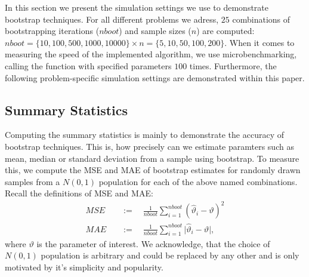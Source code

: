 In this section we present the simulation settings we use to demonstrate bootstrap techniques. For all different problems we adress, $25$ combinations of bootstrapping iterations ($nboot$) and sample sizes ($n$) are computed: $nboot = \{10, 100, 500, 1000, 10000\} \times n = \{5, 10, 50, 100, 200\}$. When it comes to measuring the speed of the implemented algorithm, we use microbenchmarking, calling the function with specified parameters $100$ times. Furthermore, the following problem-specific simulation settings are demonstrated within this paper.

\subsection{Summary Statistics}
Computing the summary statistics is mainly to demonstrate the accuracy of bootstrap techniques. This is, how precisely can we estimate paramters such as mean, median or standard deviation from a sample using bootstrap. To measure this, we compute the MSE and MAE of bootstrap estimates for randomly drawn samples from a $N(0,1)$ population for each of the above named combinations. Recall the definitions of MSE and MAE:
\begin{align*}
	MSE \quad &:= \quad \frac{1}{nboot} \sum_{i=1}^{nboot} (\hat{\vartheta}_i - \vartheta)^2 \\
	MAE \quad &:= \quad \frac{1}{nboot} \sum_{i=1}^{nboot} \lvert \hat{\vartheta}_i - \vartheta \rvert,
\end{align*}
where $\vartheta$ is the parameter of interest. We acknowledge, that the choice of $N(0,1)$ population is arbitrary and could be replaced by any other and is only motivated by it's simplicity and popularity.

